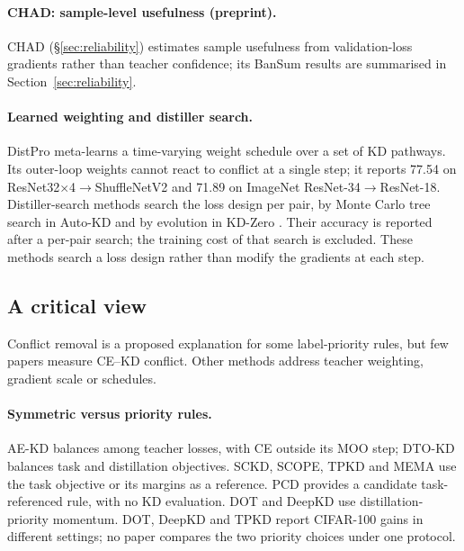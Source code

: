 \paragraph{CHAD: sample-level usefulness (preprint).}
CHAD \citep{sumit2026chad} (\S\ref{sec:reliability}) estimates sample usefulness from validation-loss gradients rather than teacher confidence; its BanSum results are summarised in Section~\ref{sec:reliability}.

\paragraph{Learned weighting and distiller search.}
DistPro \citep{deng2022distpro} meta-learns a time-varying weight schedule over a set of KD pathways. Its outer-loop weights cannot react to conflict at a single step; it reports 77.54 on ResNet32$\times$4$\to$ShuffleNetV2 and 71.89 on ImageNet ResNet-34$\to$ResNet-18.
Distiller-search methods search the loss design per pair, by Monte Carlo tree search in Auto-KD \citep{li2023autokd} and by evolution in KD-Zero \citep{li2023kdzero}. Their accuracy is reported after a per-pair search; the training cost of that search is excluded. These methods search a loss design rather than modify the gradients at each step.



\subsection{A critical view}
\label{sec:kd_moo_critical}

Conflict removal is a proposed explanation for some label-priority rules, but few papers measure CE--KD conflict. Other methods address teacher weighting, gradient scale or schedules.

\paragraph{Symmetric versus priority rules.}
AE-KD balances among teacher losses, with CE outside its MOO step; DTO-KD balances task and distillation objectives. SCKD,
SCOPE, TPKD and MEMA use the task objective or its margins as a reference. PCD provides a candidate task-referenced rule, with no KD evaluation. DOT and DeepKD use distillation-priority momentum. DOT, DeepKD and TPKD report CIFAR-100 gains in different settings; no paper compares the two priority choices under one protocol.

